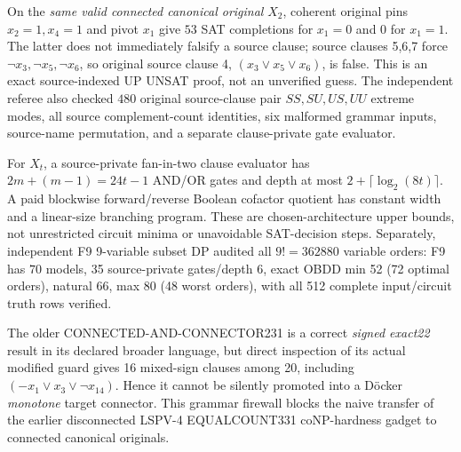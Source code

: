 \documentclass[11pt]{article}
\begin{document}
On the \emph{same valid connected canonical original} $X_2$, coherent original pins $x_2=1,x_4=1$ and pivot $x_1$ give $53$ SAT completions for $x_1=0$ and $0$ for $x_1=1$. The latter does not immediately falsify a source clause; source clauses 5,6,7 force $\neg x_3,\neg x_5,\neg x_6$, so original source clause 4, $(x_3\vee x_5\vee x_6)$, is false. This is an exact source-indexed UP UNSAT proof, not an unverified guess. The independent referee also checked $480$ original source-clause pair $SS,SU,US,UU$ extreme modes, all source complement-count identities, six malformed grammar inputs, source-name permutation, and a separate clause-private gate evaluator.

For $X_t$, a source-private fan-in-two clause evaluator has $2m+(m-1)=24t-1$ AND/OR gates and depth at most $2+\lceil\log_2(8t)\rceil$. A paid blockwise forward/reverse Boolean cofactor quotient has constant width and a linear-size branching program. These are chosen-architecture upper bounds, not unrestricted circuit minima or unavoidable SAT-decision steps. Separately, independent F9 9-variable subset DP audited all $9!=362880$ variable orders: F9 has $70$ models, 35 source-private gates/depth 6, exact OBDD min 52 (72 optimal orders), natural 66, max 80 (48 worst orders), with all 512 complete input/circuit truth rows verified.

The older CONNECTED-AND-CONNECTOR231 is a correct \emph{signed exact22} result in its declared broader language, but direct inspection of its actual modified guard gives 16 mixed-sign clauses among 20, including $(-x_1\vee x_3\vee\neg x_{14})$. Hence it cannot be silently promoted into a D\"ocker \emph{monotone} target connector. This grammar firewall blocks the naive transfer of the earlier disconnected LSPV-4 EQUALCOUNT331 coNP-hardness gadget to connected canonical originals.
\end{document}
